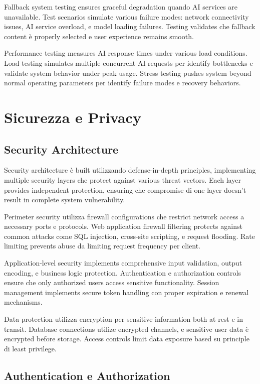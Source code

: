 \documentclass[12pt,a4paper]{article}
\begin{document}
Fallback system testing ensures graceful degradation quando AI services are unavailable. Test scenarios simulate various failure modes: network connectivity issues, AI service overload, e model loading failures. Testing validates che fallback content è properly selected e user experience remains smooth.

Performance testing measures AI response times under various load conditions. Load testing simulates multiple concurrent AI requests per identify bottlenecks e validate system behavior under peak usage. Stress testing pushes system beyond normal operating parameters per identify failure modes e recovery behaviors.

\section{Sicurezza e Privacy}

\subsection{Security Architecture}

Security architecture è built utilizzando defense-in-depth principles, implementing multiple security layers che protect against various threat vectors. Each layer provides independent protection, ensuring che compromise di one layer doesn't result in complete system vulnerability.

Perimeter security utilizza firewall configurations che restrict network access a necessary ports e protocols. Web application firewall filtering protects against common attacks come SQL injection, cross-site scripting, e request flooding. Rate limiting prevents abuse da limiting request frequency per client.

Application-level security implements comprehensive input validation, output encoding, e business logic protection. Authentication e authorization controls ensure che only authorized users access sensitive functionality. Session management implements secure token handling con proper expiration e renewal mechanisms.

Data protection utilizza encryption per sensitive information both at rest e in transit. Database connections utilize encrypted channels, e sensitive user data è encrypted before storage. Access controls limit data exposure based su principle di least privilege.

\subsection{Authentication e Authorization}
\end{document}
